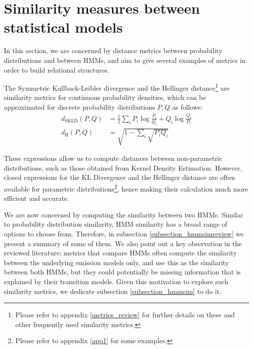 \documentclass[../main.tex]{subfiles}
\begin{document}
\section{Similarity measures between statistical models} \label{section_similarity}
In this section, we are concerned by distance metrics between probability distributions and between HMMs, and aim to give several examples of metrics in order to build relational structures.
\par The Symmetric Kullback-Leibler divergence and the Hellinger distance\footnote{Please refer to appendix \ref{metrics_review} for further details on these and other frequently used similarity metrics.} are similarity metrics for continuous probability densities, which can be approximated for discrete probability distributions $P, Q$ as follows:
\begin{align*}
d_{\text{SKLD}}(P, Q) &= \frac{1}{2}\sum_iP_i\log{\frac{P_i}{Q_i}} + Q_i\log{\frac{Q_i}{P_i}}\\
d_{\text{H}}(P, Q) &= \sqrt{1 - \sum_i \sqrt{P_iQ_i}}
\end{align*}
\par These expressions allow us to compute distances between non-parametric distributions, such as those obtained from Kernel Density Estimation. However, closed expressions for the KL Divergence and the Hellinger distance are often available for parametric distributions\footnote{Please refer to appendix \ref{app1} for some examples.}, hence making their calculation much more efficient and accurate.
\par We are now concerned by computing the similarity between two HMMs. Similar to probability distribution similarity, HMM similarity has a broad range of options to choose from. Therefore, in subsection \ref{subsection_hmmsimreview} we present a summary of some of them. We also point out a key observation in the reviewed literature: metrics that compare HMMs often compute the similarity between the underlying emission models only, and use this as the similarity between both HMMs, but they could potentially be missing information that is explained by their transition models. Given this motivation to explore such similarity metrics, we dedicate subsection \ref{subsection_hmmsim} to do it.
\end{document}
